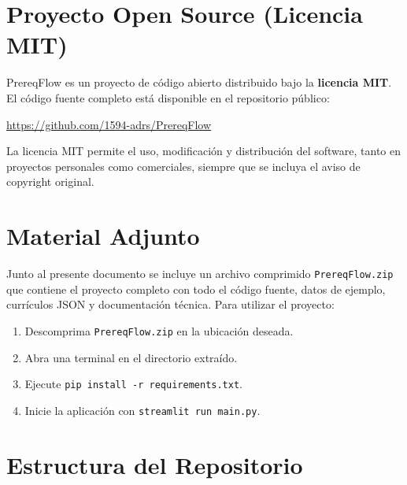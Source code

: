 \documentclass[12pt]{report}
\begin{document}
\section{Proyecto Open Source (Licencia MIT)}

PrereqFlow es un proyecto de código abierto distribuido bajo la \textbf{licencia MIT}. El código fuente completo está disponible en el repositorio público:

\begin{center}
\url{https://github.com/1594-adrs/PrereqFlow}
\end{center}

La licencia MIT permite el uso, modificación y distribución del software, tanto en proyectos personales como comerciales, siempre que se incluya el aviso de copyright original.

\section{Material Adjunto}

Junto al presente documento se incluye un archivo comprimido \texttt{PrereqFlow.zip} que contiene el proyecto completo con todo el c\'odigo fuente, datos de ejemplo, curr\'iculos JSON y documentaci\'on t\'ecnica. Para utilizar el proyecto:

\begin{enumerate}
    \item Descomprima \texttt{PrereqFlow.zip} en la ubicaci\'on deseada.
    \item Abra una terminal en el directorio extra\'ido.
    \item Ejecute \texttt{pip install -r requirements.txt}.
    \item Inicie la aplicaci\'on con \texttt{streamlit run main.py}.
\end{enumerate}

\section{Estructura del Repositorio}
\end{document}
